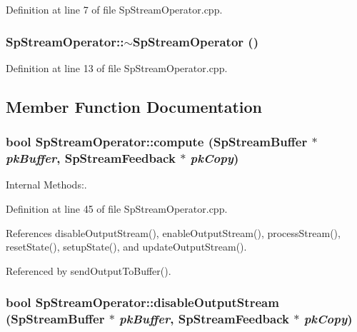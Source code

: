 Definition at line 7 of file Sp\-Stream\-Operator.cpp.
\subsubsection{\setlength{\rightskip}{0pt plus 5cm}Sp\-Stream\-Operator::$\sim${\bf Sp\-Stream\-Operator} ()\hspace{0.3cm}{\tt  [virtual]}}\label{classSpark_1_1SpStreamOperator_a1}


Definition at line 13 of file Sp\-Stream\-Operator.cpp.

\subsection{Member Function Documentation}
\subsubsection{\setlength{\rightskip}{0pt plus 5cm}bool Sp\-Stream\-Operator::compute ({\bf Sp\-Stream\-Buffer} $\ast$ {\em pk\-Buffer}, {\bf Sp\-Stream\-Feedback} $\ast$ {\em pk\-Copy})\hspace{0.3cm}{\tt  [protected, virtual]}}\label{classSpark_1_1SpStreamOperator_b0}


Internal Methods:. 

Definition at line 45 of file Sp\-Stream\-Operator.cpp.

References disable\-Output\-Stream(), enable\-Output\-Stream(), process\-Stream(), reset\-State(), setup\-State(), and update\-Output\-Stream().

Referenced by send\-Output\-To\-Buffer().
\subsubsection{\setlength{\rightskip}{0pt plus 5cm}bool Sp\-Stream\-Operator::disable\-Output\-Stream ({\bf Sp\-Stream\-Buffer} $\ast$ {\em pk\-Buffer}, {\bf Sp\-Stream\-Feedback} $\ast$ {\em pk\-Copy})\hspace{0.3cm}{\tt  [protected, virtual]}}\label{classSpark_1_1SpStreamOperator_b6}




